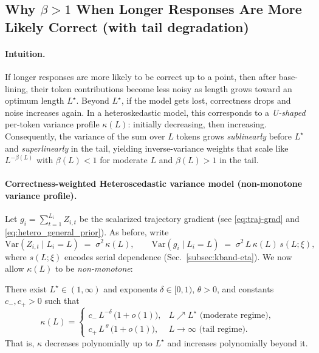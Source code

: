 \subsection{Why \texorpdfstring{$\beta>1$}{beta > 1} When Longer Responses Are More Likely Correct (with tail degradation)}\label{subsec:alpha-greater-than-1}

\paragraph{Intuition.}
If longer responses are more likely to be correct up to a point, then after base-lining, their token contributions become less noisy as length grows toward an optimum length $L^\star$. Beyond $L^\star$, if the model gets lost, correctness drops and noise increases again. In a heteroskedastic model, this corresponds to a \emph{U-shaped} per-token variance profile $\kappa(L)$: initially decreasing, then increasing. Consequently, the variance of the sum over $L$ tokens grows \emph{sublinearly} before $L^\star$ and \emph{superlinearly} in the tail, yielding inverse-variance weights that scale like $L^{-\beta(L)}$ with $\beta(L)<1$ for moderate $L$ and $\beta(L)>1$ in the tail.

\paragraph{Correctness-weighted Heteroscedastic variance model (non-monotone variance profile).}
Let $g_i=\sum_{t=1}^{L_i} Z_{i,t}$ be the scalarized trajectory gradient (see \eqref{eq:traj-grad} and \eqref{eq:hetero_general_prior}). As before, write
\begin{equation}
  \mathrm{Var}(Z_{i,t}\mid L_i=L)\;=\;\sigma^2\,\kappa(L),
  \qquad
  \mathrm{Var}(g_i\mid L_i=L)\;=\;\sigma^2\,L\,\kappa(L)\,s(L;\xi),
  \label{eq:var-sum-kappa}
\end{equation}
where $s(L;\xi)$ encodes serial dependence (Sec.~\ref{subsec:kband-eta}). We now allow $\kappa(L)$ to be \emph{non-monotone}:
\begin{assumption}\label{assump:tail}
There exist $L^\star\in(1,\infty)$ and exponents $\delta\in[0,1)$, $\theta>0$, and constants $c_-,c_+>0$ such that
\[
\kappa(L)
=\begin{cases}
c_-\,L^{-\delta}\,\big(1+o(1)\big), & L\nearrow L^\star \text{ (moderate regime)},\\[2pt]
c_+\,L^{\ \theta}\,\big(1+o(1)\big), & L\to\infty \text{ (tail regime)}.
\end{cases}
\]
That is, $\kappa$ decreases polynomially up to $L^\star$ and increases polynomially beyond it.
\end{assumption}


